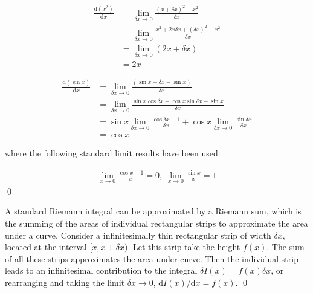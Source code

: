 \documentclass[12pt]{article}
\begin{document}
\begin{equation}
    \begin{split}
        \frac{\mathrm{d}(x^{2})}{\mathrm{d}x} &= \lim_{\delta x \to 0} \frac{(x + \delta x)^{2} - x^{2}}{\delta x} \\
        &= \lim_{\delta x \to 0} \frac{x^{2} + 2x \delta x + (\delta x)^{2} - x^{2}}{\delta x} \\
        &= \lim_{\delta x \to 0} (2x + \delta x) \\
        &= 2x
    \end{split}
\end{equation}

\begin{equation}
    \begin{split}
        \frac{\mathrm{d}(\sin{x})}{\mathrm{d}x} &= \lim_{\delta x \to 0} \frac{(\sin{x + \delta x} - \sin{x})}{\delta x} \\
        &= \lim_{\delta x \to 0} \frac{\sin{x} \cos{\delta x} + \cos{x} \sin{\delta x} - \sin{x}}{\delta x} \\
        &= \sin{x} \lim_{\delta x \to 0} \frac{\cos{\delta x} - 1}{\delta x} + \cos{x} \lim_{\delta x \to 0} \frac{\sin{\delta x}}{\delta x} \\
        &= \cos{x}
    \end{split}
\end{equation}

where the following standard limit results have been used:

\begin{equation}
    \begin{split}
        \lim_{x \to 0} \frac{\cos{x} - 1}{x} = 0, \; \lim_{x \to 0} \frac{\sin{x}}{x} = 1
    \end{split}
\end{equation}
\qed


A standard Riemann integral can be approximated by a Riemann sum, which is the summing of the areas of individual rectangular strips to approximate the area under a curve. Consider a infinitesimally thin rectangular strip of width $\delta x$, located at the interval $[x, x + \delta x)$. Let this strip take the height $f(x)$. The sum of all these strips approximates the area under curve. Then the individual strip leads to an infinitesimal contribution to the integral $\delta I(x) = f(x) \delta x$, or rearranging and taking the limit $\delta x \to 0$, $\mathrm{d}I(x)/\mathrm{d}x = f(x)$.
\qed
\end{document}
